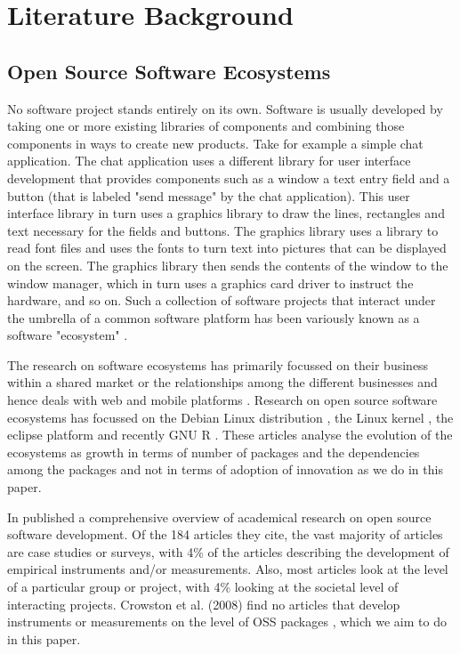 \documentclass[smallextended,final]{svjour3}
\begin{document}
\section{Literature Background}


\subsection{ Open Source Software Ecosystems}
No software project stands entirely on its own. Software is usually developed by taking one or more existing libraries of components and combining those components in ways to create new products. Take for example a simple chat application. The chat application uses a different library for user interface development that provides components such as a window a text entry field and a button (that is labeled "send message" by the chat application). This user interface library in turn uses a graphics library to draw the lines, rectangles and text necessary for the fields and buttons. The graphics library uses a library to read font files and uses the fonts to turn text into pictures that can be displayed on the screen. The graphics library then sends the contents of the window to the window manager, which in turn uses a graphics card driver to instruct the hardware, and so on.  Such a collection of software projects that interact under the umbrella of a common software platform has been variously known as a software "ecosystem" \citep{manikas13}. 

The research on software ecosystems has primarily focussed on their business within a shared market or the relationships among the different businesses and hence deals with web and mobile platforms \citep{german13}.  Research on open source software ecosystems has focussed on the Debian Linux distribution \citep{gonzalez09, german07}, the Linux kernel \citep{godfrey00}, the eclipse platform \citep{wermelinger08} and recently GNU R \citep{german13}. These articles analyse the evolution of the ecosystems as growth in terms of number of packages and the dependencies among the packages and not in terms of adoption of innovation as we do in this paper.

In \citet{crowston08} published a comprehensive overview of academical research on open source software development. Of the 184 articles they cite, the vast majority of articles are case studies or surveys, with 4\% of the articles describing the development of empirical instruments and/or measurements. Also, most articles look at the level of a particular group or project, with 4\% looking at the societal level of interacting projects. Crowston et al. (2008) find no articles that develop instruments or measurements on the level of OSS packages \citep{crowston08}, which we aim to do in this paper.
\end{document}

